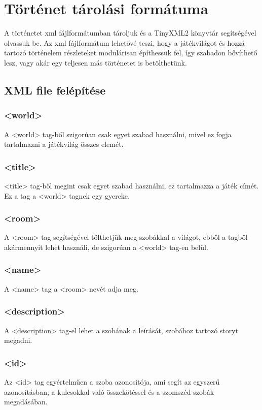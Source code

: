 \documentclass{scrarticle}
\begin{document}
\section{Történet tárolási formátuma}
A történetet xml fájlformátumban tároljuk és a TinyXML2 könyvtár segítségével olvassuk be. Az xml fájlformátum lehetővé teszi, hogy a játékvilágot és hozzá tartozó történelem részleteket modulárisan építhessük fel, így szabadon bővíthető lesz, vagy akár egy teljesen más történetet is betölthetünk.

\subsection{XML file felépítése}

\subsubsection{<world>}
A <world> tag-ből szigorúan csak egyet szabad használni, mivel ez fogja tartalmazni a játékvilág összes elemét.

\subsubsection{<title>}
<title> tag-ből megint csak egyet szabad használni, ez tartalmazza a játék címét. Ez a tag a <world> tagnek egy gyereke.

\subsubsection{<room>}
A <room> tag segítségével tölthetjük meg szobákkal a világot, ebből a tagből akármennyit lehet használi, de szigorúan a <world> tag-en belül.

\subsubsection{<name>}
A <name> tag a <room> nevét adja meg.

\subsubsection{<description>}
A <description> tag-el lehet a szobának a leírását, szobához tartozó storyt megadni.

\subsubsection{<id>}
Az <id> tag egyértelműen a szoba azonosítója, ami segít az egyszerű azonosításban, a kulcsokkal való összekötéssel és a szomszéd szobák megadásában.
\end{document}
